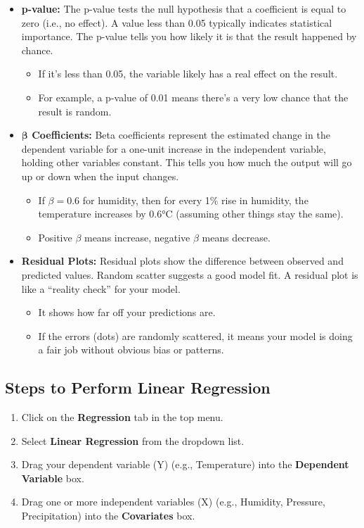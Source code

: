 \begin{itemize}
    \item \textbf{p-value:} The p-value tests the null hypothesis that a coefficient is equal to zero (i.e., no effect). A value less than 0.05 typically indicates statistical importance. The p-value tells you how likely it is that the result happened by chance.
    \begin{itemize}
        \item If it’s less than 0.05, the variable likely has a real effect on the result. 
        \item For example, a p-value of 0.01 means there’s a very low chance that the result is random.
       \end{itemize}
    \item \textbf{$\boldsymbol{\beta}$ Coefficients:} Beta coefficients represent the estimated change in the dependent variable for a one-unit increase in the independent variable, holding other variables constant. This tells you how much the output will go up or down when the input changes.
    \begin{itemize}
        \item If $\beta = 0.6$ for humidity, then for every 1\% rise in humidity, the temperature increases by 0.6°C (assuming other things stay the same). \item Positive $\beta$ means increase, negative $\beta$ means decrease.
      \end{itemize}
    \item \textbf{Residual Plots:} Residual plots show the difference between observed and predicted values. Random scatter suggests a good model fit. A residual plot is like a ``reality check'' for your model.
    \begin{itemize}
        \item It shows how far off your predictions are.
        \item If the errors (dots) are randomly scattered, it means your model is doing a fair job without obvious bias or patterns.
    \end{itemize}

\end{itemize}

\subsection*{Steps to Perform Linear Regression}

\begin{enumerate}
    \item Click on the \textbf{Regression} tab in the top menu.
    \item Select \textbf{Linear Regression} from the dropdown list.
    \item Drag your dependent variable (Y) (e.g., Temperature) into the \textbf{Dependent Variable} box.
    \item Drag one or more independent variables (X) (e.g., Humidity, Pressure, Precipitation) into the \textbf{Covariates} box.
\end{enumerate}

